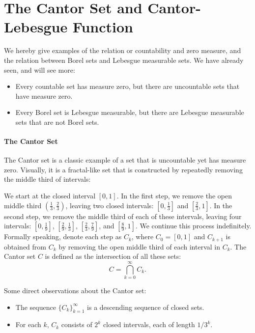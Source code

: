 \documentclass[../main.tex]{subfiles}
\begin{document}
\section{The Cantor Set and Cantor-Lebesgue Function}
We hereby give examples of the relation or countability and zero measure, and the relation between Borel sets and Lebesgue measurable sets. We have already seen, and will see more:
\begin{itemize}
  \item Every countable set has measure zero, but there are uncountable sets that have measure zero.
  \item Every Borel set is Lebesgue measurable, but there are Lebesgue measurable sets that are not Borel sets.
\end{itemize}

\paragraph{The Cantor Set} The Cantor set is a classic example of a set that is uncountable yet has measure zero. Visually, it is a fractal-like set that is constructed by repeatedly removing the middle third of intervals:

We start at the closed interval $[0, 1]$. In the first step, we remove the open middle third $(\frac{1}{3}, \frac{2}{3})$, leaving two closed intervals: $[0, \frac{1}{3}]$ and $[\frac{2}{3}, 1]$. In the second step, we remove the middle third of each of these intervals, leaving four intervals: $[0, \frac{1}{9}]$, $[\frac{2}{9}, \frac{1}{3}]$, $[\frac{2}{3}, \frac{7}{9}]$, and $[\frac{8}{9}, 1]$. We continue this process indefinitely. Formally speaking, denote each step as $C_k$, where $C_0 = [0, 1]$ and $C_{k+1}$ is obtained from $C_k$ by removing the open middle third of each interval in $C_k$. The Cantor set $C$ is defined as the intersection of all these sets:
\begin{equation}
  C = \bigcap_{k=0}^{\infty} C_k.
\end{equation}

Some direct observations about the Cantor set:
\begin{itemize}
  \item The sequence $\{C_k\}_{k=1}^{\infty}$ is a descending sequence of closed sets.
  \item For each $k$, $C_k$ consists of $2^k$ closed intervals, each of length $1 / 3^k$.
\end{itemize}
\end{document}
